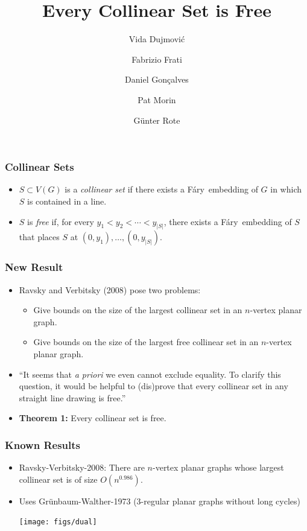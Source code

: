 \documentclass[xcolor=dvipsnames]{beamer}
\title{Every Collinear Set is Free}
\author{Vida Dujmović \and Fabrizio Frati \and Daniel Gonçalves
        \and Pat Morin \and Günter Rote}
\newcommand{\Fary}{F\'ary}
\begin{document}
\begin{frame}
  \titlepage
\end{frame}

\begin{frame}
  \frametitle{Collinear Sets}

  \begin{itemize}
    \item<2-> $S\subset V(G)$ is a \emph{collinear set} if there exists a \Fary\ embedding of $G$ in which $S$ is contained in a line.
    \item<3-> $S$ is \emph{free} if, for every $y_1<y_2<\cdots<y_{|S|}$, there exists a \Fary\ embedding of $S$ that places $S$ at $(0,y_1),\ldots,(0,y_{|S|})$.
  \end{itemize}
\end{frame}

\begin{frame}
  \frametitle{New Result}

  \begin{itemize}
     \item<+-> Ravsky and Verbitsky (2008) pose two problems:
       \begin{itemize}
          \item<+-> Give bounds on the size of the largest collinear set in an $n$-vertex planar graph.
          \item<+-> Give bounds on the size of the largest free collinear set in an $n$-vertex planar graph.
       \end{itemize}
   \item<+->
   ``It seems that \emph{a priori} we even cannot exclude equality. To clarify
   this question, it would be helpful to (dis)prove that every collinear
   set in any straight line drawing is free.''
   \item<+-> \textbf{Theorem 1:} Every collinear set is free.
  \end{itemize}
\end{frame}


\begin{frame}
   \frametitle{Known Results}
   \begin{itemize}
      \item<+-> Ravsky-Verbitsky-2008: There are $n$-vertex planar graphs whose
      largest collinear set is of size $O(n^{0.986})$. 
      \item<+-> Uses Gr\"unbaum-Walther-1973 (3-regular planar graphs without long cycles)
      \centerline{\texttt{[image: figs/dual]}}
    \end{itemize}
\end{frame}
\end{document}
